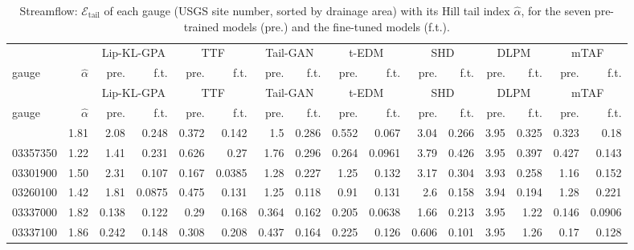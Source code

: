 \begin{longtable}{l r rr rr rr rr rr rr rr}
\caption{Streamflow: $\mathcal{E}_{\mathrm{tail}}$ of each gauge (USGS site number, sorted by drainage area) with its Hill tail index $\hat\alpha$, for the seven pre-trained models (pre.) and the fine-tuned models (f.t.).}\label{tab:sf_tail}\\ \toprule
 & & \multicolumn{2}{c}{Lip-KL-GPA} & \multicolumn{2}{c}{TTF} & \multicolumn{2}{c}{Tail-GAN} & \multicolumn{2}{c}{t-EDM} & \multicolumn{2}{c}{SHD} & \multicolumn{2}{c}{DLPM} & \multicolumn{2}{c}{mTAF}\\
\cmidrule(lr){3-4} \cmidrule(lr){5-6} \cmidrule(lr){7-8} \cmidrule(lr){9-10} \cmidrule(lr){11-12} \cmidrule(lr){13-14} \cmidrule(lr){15-16}
gauge & $\hat\alpha$ & pre. & f.t. & pre. & f.t. & pre. & f.t. & pre. & f.t. & pre. & f.t. & pre. & f.t. & pre. & f.t.\\ \midrule \endfirsthead
\toprule  & & \multicolumn{2}{c}{Lip-KL-GPA} & \multicolumn{2}{c}{TTF} & \multicolumn{2}{c}{Tail-GAN} & \multicolumn{2}{c}{t-EDM} & \multicolumn{2}{c}{SHD} & \multicolumn{2}{c}{DLPM} & \multicolumn{2}{c}{mTAF}\\
\cmidrule(lr){3-4} \cmidrule(lr){5-6} \cmidrule(lr){7-8} \cmidrule(lr){9-10} \cmidrule(lr){11-12} \cmidrule(lr){13-14} \cmidrule(lr){15-16}
gauge & $\hat\alpha$ & pre. & f.t. & pre. & f.t. & pre. & f.t. & pre. & f.t. & pre. & f.t. & pre. & f.t. & pre. & f.t.\\ \midrule \endhead \bottomrule \endfoot
03284525 & 1.81 & 2.08 & {0.248} & 0.372 & {0.142} & 1.5 & {0.286} & 0.552 & {0.067} & 3.04 & {0.266} & 3.95 & {0.325} & 0.323 & {0.18}\\
03357350 & 1.22 & 1.41 & {0.231} & 0.626 & {0.27} & 1.76 & {0.296} & 0.264 & {0.0961} & 3.79 & {0.426} & 3.95 & {0.397} & 0.427 & {0.143}\\
03301900 & 1.50 & 2.31 & {0.107} & 0.167 & {0.0385} & 1.28 & {0.227} & 1.25 & {0.132} & 3.17 & {0.304} & 3.93 & {0.258} & 1.16 & {0.152}\\
03260100 & 1.42 & 1.81 & {0.0875} & 0.475 & {0.131} & 1.25 & {0.118} & 0.91 & {0.131} & 2.6 & {0.158} & 3.94 & {0.194} & 1.28 & {0.221}\\
03337000 & 1.82 & 0.138 & {0.122} & 0.29 & {0.168} & 0.364 & {0.162} & 0.205 & {0.0638} & 1.66 & {0.213} & 3.95 & {1.22} & 0.146 & {0.0906}\\
03337100 & 1.86 & 0.242 & {0.148} & 0.308 & {0.208} & 0.437 & {0.164} & 0.225 & {0.126} & 0.606 & {0.101} & 3.95 & {1.26} & 0.17 & {0.128}\\

\end{longtable}
